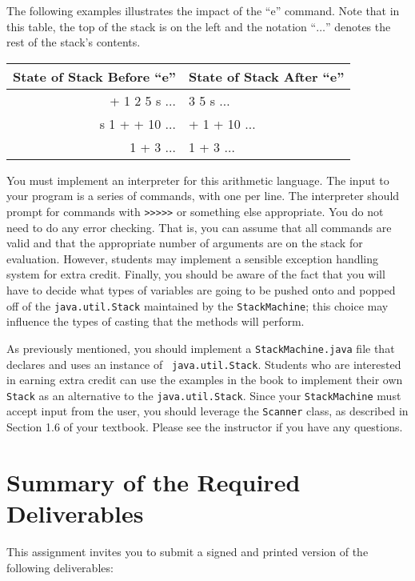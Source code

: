 The following examples illustrates the impact of the ``e'' command. Note that in this table, the top of the stack is on
the left and the notation ``$\ldots$'' denotes the rest of the stack's contents. 

\begin{tabular}{r | l}
State of Stack Before ``e'' & State of Stack After ``e'' \\ \hline
+ 1 2 5 s $\ldots$  & 3 5 s $\ldots$ \\
s 1 + + 10 $\ldots$ & + 1 + 10 $\ldots$ \\
1 + 3 $\ldots$      & 1 + 3 $\ldots$ \\
\end{tabular}

You must implement an interpreter for this arithmetic language. The input to your program is a series of commands, with
one per line. The interpreter should prompt for commands with
\texttt{\textgreater{}\textgreater{}\textgreater{}\textgreater{}\textgreater{}} or something else appropriate. You do
not need to do any error checking.  That is, you can assume that all commands are valid and that the appropriate number
of arguments are on the stack for evaluation. However, students may implement a sensible exception handling system for
extra credit.  Finally, you should be aware of the fact that you will have to decide what types of variables are going
to be pushed onto and popped off of the {\tt java.util.Stack} maintained by the \texttt{StackMachine}; this choice may
influence the types of casting that the methods will perform.

As previously mentioned, you should implement a {\tt StackMachine.java} file that declares and uses an instance of {\tt
java.util.Stack}. Students who are interested in earning extra credit can use the examples in the book to implement
their own {\tt Stack} as an alternative to the {\tt java.util.Stack}.  Since your {\tt StackMachine} must accept input
from the user, you should leverage the {\tt Scanner} class, as described in Section 1.6 of your textbook. Please see the
instructor if you have any questions.

\section*{Summary of the Required Deliverables}

  This assignment invites you to submit a signed and printed version of the following deliverables: 

